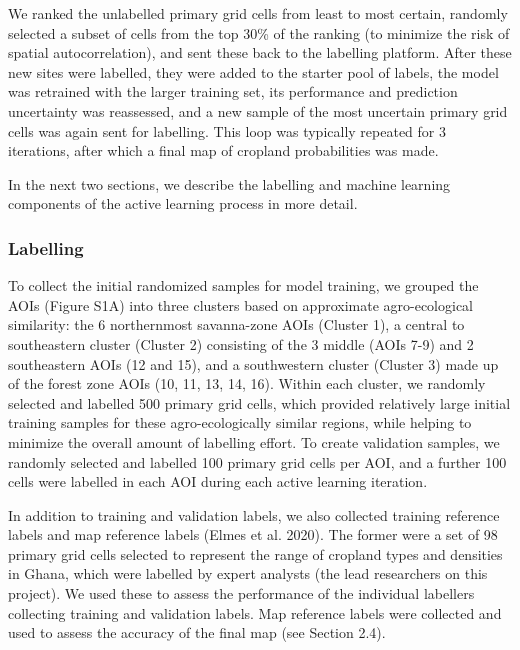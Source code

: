 \documentclass[11pt,a4paper]{article}
\begin{document}
We ranked the unlabelled primary grid cells from least to most certain,
randomly selected a subset of cells from the top 30\% of the ranking (to
minimize the risk of spatial autocorrelation), and sent these back to
the labelling platform. After these new sites were labelled, they were
added to the starter pool of labels, the model was retrained with the
larger training set, its performance and prediction uncertainty was
reassessed, and a new sample of the most uncertain primary grid cells
was again sent for labelling. This loop was typically repeated for 3
iterations, after which a final map of cropland probabilities was made.

In the next two sections, we describe the labelling and machine learning
components of the active learning process in more detail.

\hypertarget{labelling}{%
\subsubsection{Labelling}\label{labelling}}

To collect the initial randomized samples for model training, we grouped
the AOIs (Figure S1A) into three clusters based on approximate
agro-ecological similarity: the 6 northernmost savanna-zone AOIs
(Cluster 1), a central to southeastern cluster (Cluster 2) consisting of
the 3 middle (AOIs 7-9) and 2 southeastern AOIs (12 and 15), and a
southwestern cluster (Cluster 3) made up of the forest zone AOIs (10,
11, 13, 14, 16). Within each cluster, we randomly selected and labelled
500 primary grid cells, which provided relatively large initial training
samples for these agro-ecologically similar regions, while helping to
minimize the overall amount of labelling effort. To create validation
samples, we randomly selected and labelled 100 primary grid cells per
AOI, and a further 100 cells were labelled in each AOI during each
active learning iteration.

In addition to training and validation labels, we also collected
training reference labels and map reference labels (Elmes et al. 2020).
The former were a set of 98 primary grid cells selected to represent the
range of cropland types and densities in Ghana, which were labelled by
expert analysts (the lead researchers on this project). We used these to
assess the performance of the individual labellers collecting training
and validation labels. Map reference labels were collected and used to
assess the accuracy of the final map (see Section 2.4).
\end{document}
